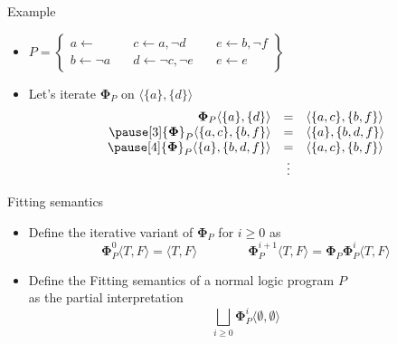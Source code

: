 \begin{frame}{Example}
  \bigskip
  \begin{itemize}
  \item<1->
    \(
    P
    =
    \left\{
      \begin{array}{lll}
        a \leftarrow                \quad &
        c \leftarrow a, \neg d      \quad &
        e \leftarrow b, \neg f
        \\
        b \leftarrow \neg a         \quad &
        d \leftarrow \neg c, \neg e \quad &
        e \leftarrow e
      \end{array}
    \right\}
    \)
    \bigskip
  \item<2-> Let's iterate ${\mathbf{\Phi}}_{P}$ on $\langle \{a\}, \{d\}\rangle$
    \[
    \begin{array}{rcl}
    {\mathbf{\Phi}}_{P}\langle\{a  \},\{  d  \}\rangle &=&\langle\{a,c\},\{b,f  \}\rangle
    \\\pause[3]
    {\mathbf{\Phi}}_{P}\langle\{a,c\},\{b,  f\}\rangle &=&\langle\{a  \},\{b,d,f\}\rangle
    \\\pause[4]
    {\mathbf{\Phi}}_{P}\langle\{a  \},\{b,d,f\}\rangle &=&\langle\{a,c\},\{b,f  \}\rangle
    \\
    & \vdots &
    \end{array}
    \]
  \end{itemize}
\end{frame}
\begin{frame}{Fitting semantics}
  \bigskip
  \begin{itemize}
  \item<1-> Define the iterative variant of ${\mathbf{\Phi}}_P$ for $i\geq 0$ as
    \[
      {\mathbf{\Phi}}_P^0\langle T, F \rangle = \langle T, F \rangle
      \qquad\qquad
      {\mathbf{\Phi}}_P^{i+1}\langle T, F \rangle =
      {\mathbf{\Phi}}_P{\mathbf{\Phi}}_P^i\langle T, F \rangle
    \]
  \item<2-> Define the \alert{Fitting semantics} of a normal logic program $P$\\
    as the partial interpretation
    \[
      \textstyle{\bigsqcup_{i \geq 0}} {\mathbf{\Phi}}_P^i \langle \emptyset, \emptyset \rangle
    \]
  \end{itemize}
\nocite{fitting85a}
\end{frame}
